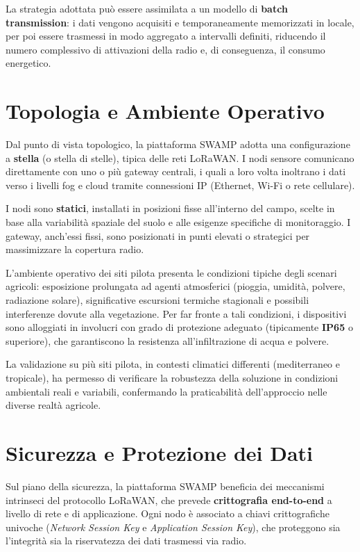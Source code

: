 La strategia adottata può essere assimilata a un modello di \textbf{batch transmission}: i dati vengono acquisiti e temporaneamente memorizzati in locale, per poi essere trasmessi in modo aggregato a intervalli definiti, riducendo il numero complessivo di attivazioni della radio e, di conseguenza, il consumo energetico.


\section{Topologia e Ambiente Operativo}

Dal punto di vista topologico, la piattaforma SWAMP adotta una configurazione a \textbf{stella} (o stella di stelle), tipica delle reti LoRaWAN. I nodi sensore comunicano direttamente con uno o più gateway centrali, i quali a loro volta inoltrano i dati verso i livelli fog e cloud tramite connessioni IP (Ethernet, Wi-Fi o rete cellulare).

I nodi sono \textbf{statici}, installati in posizioni fisse all'interno del campo, scelte in base alla variabilità spaziale del suolo e alle esigenze specifiche di monitoraggio. I gateway, anch'essi fissi, sono posizionati in punti elevati o strategici per massimizzare la copertura radio.

L'ambiente operativo dei siti pilota presenta le condizioni tipiche degli scenari agricoli: esposizione prolungata ad agenti atmosferici (pioggia, umidità, polvere, radiazione solare), significative escursioni termiche stagionali e possibili interferenze dovute alla vegetazione. Per far fronte a tali condizioni, i dispositivi sono alloggiati in involucri con grado di protezione adeguato (tipicamente \textbf{IP65} o superiore), che garantiscono la resistenza all'infiltrazione di acqua e polvere.

La validazione su più siti pilota, in contesti climatici differenti (mediterraneo e tropicale), ha permesso di verificare la robustezza della soluzione in condizioni ambientali reali e variabili, confermando la praticabilità dell'approccio nelle diverse realtà agricole.


\section{Sicurezza e Protezione dei Dati}

Sul piano della sicurezza, la piattaforma SWAMP beneficia dei meccanismi intrinseci del protocollo LoRaWAN, che prevede \textbf{crittografia end-to-end} a livello di rete e di applicazione. Ogni nodo è associato a chiavi crittografiche univoche (\textit{Network Session Key} e \textit{Application Session Key}), che proteggono sia l'integrità sia la riservatezza dei dati trasmessi via radio.

